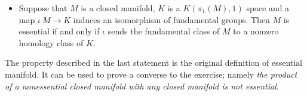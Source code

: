 \begin{itemize}
 \item Suppose that $M$ is a closed manifold, 
$K$ is a $K(\pi_1(M),1)$ space and a map $\iota\:M\to K$ induces an isomorphism of fundamental groups.
Then $M$ is essential if and only if $\iota$ sends the fundamental class of $M$ to a nonzero homology class of $K$.
\end{itemize}

The property described in the last statement is the original definition of essential manifold.
It can be used to prove a converse to the exercise;
namely \textit{the product of a nonessential closed manifold with any closed manifold is not essential}.



